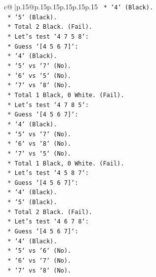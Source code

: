 \documentclass{article}
\begin{document}
{\begin{supertabular}{c@{$\;$}|p{.15\linewidth}@{}p{.15\linewidth}p{.15\linewidth}p{.15\linewidth}p{.15\linewidth}p{.15\linewidth}}
{{{\texttt{                    *   `4` (Black).} \\
\texttt{                    *   `5` (Black).} \\
\texttt{                    *   Total 2 Black. (Fail).} \\
\texttt{            *   Let's test `4 7 5 8`:} \\
\texttt{                *   Guess `{[}4 5 6 7{]}`:} \\
\texttt{                    *   `4` (Black).} \\
\texttt{                    *   `5` vs `7` (No).} \\
\texttt{                    *   `6` vs `5` (No).} \\
\texttt{                    *   `7` vs `8` (No).} \\
\texttt{                    *   Total 1 Black, 0 White. (Fail).} \\
\texttt{            *   Let's test `4 7 8 5`:} \\
\texttt{                *   Guess `{[}4 5 6 7{]}`:} \\
\texttt{                    *   `4` (Black).} \\
\texttt{                    *   `5` vs `7` (No).} \\
\texttt{                    *   `6` vs `8` (No).} \\
\texttt{                    *   `7` vs `5` (No).} \\
\texttt{                    *   Total 1 Black, 0 White. (Fail).} \\
\texttt{            *   Let's test `4 5 8 7`:} \\
\texttt{                *   Guess `{[}4 5 6 7{]}`:} \\
\texttt{                    *   `4` (Black).} \\
\texttt{                    *   `5` (Black).} \\
\texttt{                    *   Total 2 Black. (Fail).} \\
\texttt{            *   Let's test `4 6 7 8`:} \\
\texttt{                *   Guess `{[}4 5 6 7{]}`:} \\
\texttt{                    *   `4` (Black).} \\
\texttt{                    *   `5` vs `6` (No).} \\
\texttt{                    *   `6` vs `7` (No).} \\
\texttt{                    *   `7` vs `8` (No).} \\
}}}
\end{supertabular}}
\end{document}
